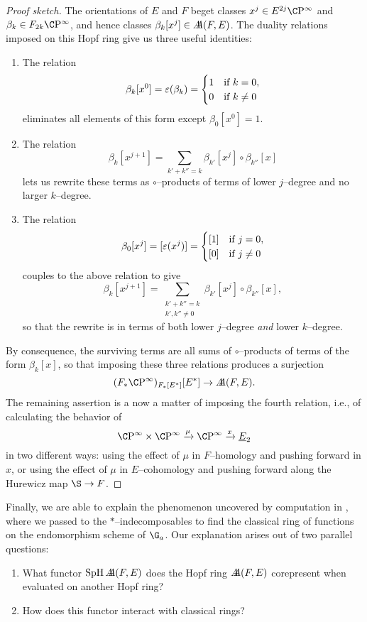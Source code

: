 \begin{proof}[Proof sketch]
The orientations of $E$ and $F$ beget classes $x^j \in E^{2j} \CP^\infty$ and $\beta_k \in F_{2k} \CP^\infty$, and hence classes $\beta_k[x^j] \in \AA(F, E)$.  The duality relations imposed on this Hopf ring give us three useful identities:
\begin{enumerate}
    \item The relation \[\beta_k[x^0] = \eps(\beta_k) = \begin{cases} 1 & \text{if $k = 0$}, \\ 0 & \text{if $k \ne 0$}\end{cases}\] eliminates all elements of this form except $\beta_0[x^0] = 1$.
    \item The relation \[\beta_k[x^{j+1}] = \sum_{k' + k'' = k} \beta_{k'}[x^j] \circ \beta_{k''}[x]\] lets us rewrite these terms as $\circ$--products of terms of lower $j$--degree and no larger $k$--degree.
    \item The relation \[\beta_0[x^j] = [\eps(x^j)] = \begin{cases} [1] & \text{if $j = 0$}, \\ [0] & \text{if $j \ne 0$}\end{cases}\] couples to the above relation to give \[\beta_k[x^{j+1}] = \sum_{\substack{k' + k'' = k \\ k', k'' \ne 0}} \beta_{k'}[x^j] \circ \beta_{k''}[x],\] so that the rewrite is in terms of both lower $j$--degree \emph{and} lower $k$--degree.
\end{enumerate}
By consequence, the surviving terms are all sums of $\circ$--products of terms of the form $\beta_k[x]$, so that imposing these three relations produces a surjection \[(F_* \CP^\infty)_{F_*[E^*]}[E^*] \to \AA(F, E).\]  The remaining assertion is a now a matter of imposing the fourth relation, i.e., of calculating the behavior of \[\CP^\infty \times \CP^\infty \xrightarrow{\mu} \CP^\infty \xrightarrow{x} \OS{E}{2}\] in two different ways: using the effect of $\mu$ in $F$--homology and pushing forward in $x$, or using the effect of $\mu$ in $E$--cohomology and pushing forward along the Hurewicz map $\S \to F$.
\end{proof}



Finally, we are able to explain the phenomenon uncovered by computation in , where we passed to the $\ast$--indecomposables to find the classical ring of functions on the endomorphism scheme of $\G_a$.  Our explanation arises out of two parallel questions:
\begin{enumerate}
	\item What functor $\SpH \AA(F, E)$ does the Hopf ring $\AA(F, E)$ corepresent when evaluated on another Hopf ring?
	\item How does this functor interact with classical rings?
\end{enumerate}

